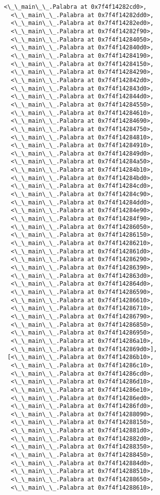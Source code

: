 \documentclass[12pt,a4paper,table]{article}
\begin{document}
\begin{tcolorbox}[breakable, size=fbox, boxrule=.5pt, pad at break*=1mm, opacityfill=0]
\begin{Verbatim}[commandchars=\\\{\}]
  <\_\_main\_\_.Palabra at 0x7f4f14282cd0>,
  <\_\_main\_\_.Palabra at 0x7f4f14282dd0>,
  <\_\_main\_\_.Palabra at 0x7f4f14282ed0>,
  <\_\_main\_\_.Palabra at 0x7f4f14282f90>,
  <\_\_main\_\_.Palabra at 0x7f4f14284050>,
  <\_\_main\_\_.Palabra at 0x7f4f142840d0>,
  <\_\_main\_\_.Palabra at 0x7f4f14284190>,
  <\_\_main\_\_.Palabra at 0x7f4f14284150>,
  <\_\_main\_\_.Palabra at 0x7f4f14284290>,
  <\_\_main\_\_.Palabra at 0x7f4f142842d0>,
  <\_\_main\_\_.Palabra at 0x7f4f142843d0>,
  <\_\_main\_\_.Palabra at 0x7f4f142844d0>,
  <\_\_main\_\_.Palabra at 0x7f4f14284550>,
  <\_\_main\_\_.Palabra at 0x7f4f14284610>,
  <\_\_main\_\_.Palabra at 0x7f4f14284690>,
  <\_\_main\_\_.Palabra at 0x7f4f14284750>,
  <\_\_main\_\_.Palabra at 0x7f4f14284810>,
  <\_\_main\_\_.Palabra at 0x7f4f14284910>,
  <\_\_main\_\_.Palabra at 0x7f4f142849d0>,
  <\_\_main\_\_.Palabra at 0x7f4f14284a50>,
  <\_\_main\_\_.Palabra at 0x7f4f14284b10>,
  <\_\_main\_\_.Palabra at 0x7f4f14284bd0>,
  <\_\_main\_\_.Palabra at 0x7f4f14284cd0>,
  <\_\_main\_\_.Palabra at 0x7f4f14284c90>,
  <\_\_main\_\_.Palabra at 0x7f4f14284dd0>,
  <\_\_main\_\_.Palabra at 0x7f4f14284e90>,
  <\_\_main\_\_.Palabra at 0x7f4f14284f90>,
  <\_\_main\_\_.Palabra at 0x7f4f14286050>,
  <\_\_main\_\_.Palabra at 0x7f4f14286150>,
  <\_\_main\_\_.Palabra at 0x7f4f14286210>,
  <\_\_main\_\_.Palabra at 0x7f4f142861d0>,
  <\_\_main\_\_.Palabra at 0x7f4f14286290>,
  <\_\_main\_\_.Palabra at 0x7f4f14286390>,
  <\_\_main\_\_.Palabra at 0x7f4f142863d0>,
  <\_\_main\_\_.Palabra at 0x7f4f142864d0>,
  <\_\_main\_\_.Palabra at 0x7f4f14286590>,
  <\_\_main\_\_.Palabra at 0x7f4f14286610>,
  <\_\_main\_\_.Palabra at 0x7f4f14286710>,
  <\_\_main\_\_.Palabra at 0x7f4f14286790>,
  <\_\_main\_\_.Palabra at 0x7f4f14286850>,
  <\_\_main\_\_.Palabra at 0x7f4f14286950>,
  <\_\_main\_\_.Palabra at 0x7f4f14286a10>,
  <\_\_main\_\_.Palabra at 0x7f4f142869d0>],
 [<\_\_main\_\_.Palabra at 0x7f4f14286b10>,
  <\_\_main\_\_.Palabra at 0x7f4f14286c10>,
  <\_\_main\_\_.Palabra at 0x7f4f14286cd0>,
  <\_\_main\_\_.Palabra at 0x7f4f14286d10>,
  <\_\_main\_\_.Palabra at 0x7f4f14286e10>,
  <\_\_main\_\_.Palabra at 0x7f4f14286ed0>,
  <\_\_main\_\_.Palabra at 0x7f4f14286fd0>,
  <\_\_main\_\_.Palabra at 0x7f4f14288090>,
  <\_\_main\_\_.Palabra at 0x7f4f14288150>,
  <\_\_main\_\_.Palabra at 0x7f4f142881d0>,
  <\_\_main\_\_.Palabra at 0x7f4f142882d0>,
  <\_\_main\_\_.Palabra at 0x7f4f14288350>,
  <\_\_main\_\_.Palabra at 0x7f4f14288450>,
  <\_\_main\_\_.Palabra at 0x7f4f142884d0>,
  <\_\_main\_\_.Palabra at 0x7f4f14288510>,
  <\_\_main\_\_.Palabra at 0x7f4f14288650>,
  <\_\_main\_\_.Palabra at 0x7f4f14288610>,

\end{Verbatim}
\end{tcolorbox}
\end{document}
